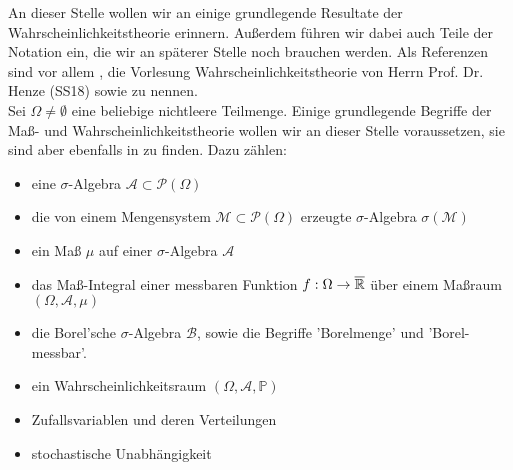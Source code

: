 An dieser Stelle wollen wir an einige grundlegende Resultate der Wahrscheinlichkeitstheorie erinnern. Außerdem führen wir dabei auch Teile der Notation ein, die wir an späterer Stelle noch brauchen werden. Als Referenzen sind vor allem \cite{brokate2016grundwissen}, die Vorlesung Wahrscheinlichkeitstheorie von Herrn Prof. Dr. Henze (SS18) sowie \cite{klenke2006wahrscheinlichkeitstheorie}
zu nennen.\\ Sei $ \Omega \not = \emptyset $ eine beliebige nichtleere Teilmenge.
Einige grundlegende Begriffe der Maß- und Wahrscheinlichkeitstheorie wollen wir an dieser Stelle voraussetzen, sie sind aber ebenfalls in \cite{klenke2006wahrscheinlichkeitstheorie} zu finden. Dazu zählen:
\begin{itemize}
	\item eine $ \sigma $-Algebra $ \mathcal{A} \subset \mathcal{P}(\Omega) $
	\item die von einem Mengensystem $ \mathcal{M} \subset \mathcal{P}(\Omega)  $ erzeugte $ \sigma $-Algebra $ \sigma(\mathcal{M}) $
	\item ein Maß $ \mu $ auf einer $ \sigma $-Algebra $ \mathcal{A} $
	\item das Maß-Integral einer messbaren Funktion $ f:\Omega \to \overline{\mathbb{R}} $ über einem Maßraum $ (\Omega, \mathcal{A},\mu) $
	\item die Borel'sche $ \sigma $-Algebra $ \mathcal{B} $, sowie die Begriffe 'Borelmenge' und 'Borel-messbar'.
	\item ein Wahrscheinlichkeitsraum $ (\Omega,\mathcal{A},\mathbb{P}) $
	\item Zufallsvariablen und deren Verteilungen
	\item stochastische Unabhängigkeit 
\end{itemize}

